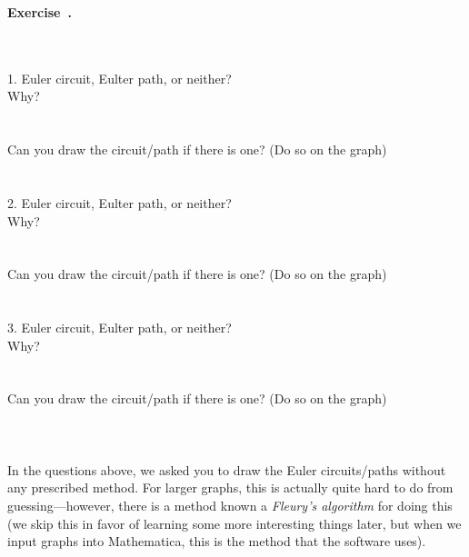 \documentclass[12pt]{article}
\newcounter{exercise}[section]
\newenvironment{exercise}[1][]{\refstepcounter{exercise}\par\medskip
	\noindent \textbf{Exercise~\thesection.\theexercise #1} \rmfamily}{\medskip}
\begin{document}
\begin{exercise}
\\
\\
1. Euler circuit, Eulter path, or neither?\\
Why?\\
\\
\\
Can you draw the circuit/path if there is one? (Do so on the graph)
\\
\\
\\
2. Euler circuit, Eulter path, or neither?\\
Why?\\
\\
\\
Can you draw the circuit/path if there is one? (Do so on the graph)
\\
\\
\\
3. Euler circuit, Eulter path, or neither?\\
Why?\\
\\
\\
Can you draw the circuit/path if there is one? (Do so on the graph)
\\
\\
\\
\end{exercise}
\\
In the questions above, we asked you to draw the Euler circuits/paths without any prescribed method. For larger graphs, this is actually quite hard to do from guessing---however, there is a method known a \emph{Fleury's algorithm} for doing this (we skip this in favor of learning some more interesting things later, but when we input graphs into Mathematica, this is the method that the software uses).
\end{document}
